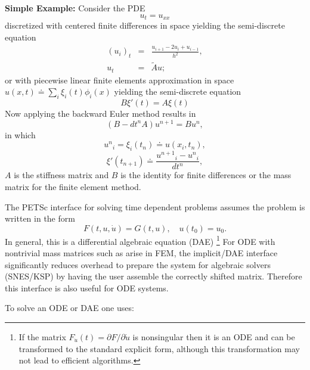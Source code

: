 \vspace{.2cm}

\noindent

{\bf Simple Example:} Consider the PDE
\[
          u_t = u_{xx}
\]
discretized with centered finite differences in space yielding  the  semi-discrete equation
\begin{eqnarray*}
          (u_i)_t & =  & \frac{u_{i+1} - 2 u_{i} + u_{i-1}}{h^2}, \\
           u_t      &  = & \tilde{A} u;
\end{eqnarray*}
or with piecewise linear finite elements approximation in space
$ u(x,t) \doteq \sum_i \xi_i(t) \phi_i(x)$ yielding the  semi-discrete equation
\[
          B {\xi}'(t) = A \xi(t)
\]
Now applying the backward Euler method results in
\[
        ( B - dt^n A  ) u^{n+1} = B u^n,
\]
in which
\[
         {u^n}_i = \xi_i(t_n) \doteq u(x_i,t_n),
\]
\[
         {\xi}'(t_{n+1}) \doteq \frac{{u^{n+1}}_i - {u^{n}}_i }{dt^{n}},
\]
$A$ is the stiffness matrix and $B$ is the identity for finite differences or the mass matrix for the finite element method.

\vspace{.2cm}

The PETSc interface for solving time dependent problems assumes the problem is written in the form
\[
        F(t,u,\dot{u}) = G(t,u), \quad u(t_0) = u_0.
\]
In general, this is a differential algebraic
equation (DAE) \footnote{If the matrix $F_{\dot{u}}(t) = \partial F
/ \partial \dot{u}$ is nonsingular then it is an ODE and can be
transformed to the standard explicit form, although this transformation
may not lead to efficient algorithms.} For ODE with nontrivial mass
matrices such as arise in FEM, the implicit/DAE interface significantly
reduces overhead to prepare the system for algebraic solvers (SNES/KSP)
by having the user assemble the correctly shifted matrix.  Therefore
this interface is also useful for ODE systems.

To solve an ODE or DAE one uses:

